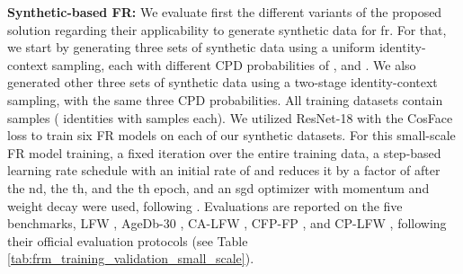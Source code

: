\documentclass[10pt,twocolumn,letterpaper]{article}
\begin{document}
\textbf{Synthetic-based FR:}
We evaluate first the different variants of the proposed solution regarding their applicability to generate synthetic data for \acrshort{fr}. For that, we start by generating three sets of synthetic data using a uniform identity-context sampling, each with different CPD probabilities of ,  and . We also generated other three sets of synthetic data using a two-stage identity-context sampling, with the same three CPD probabilities. All training datasets contain  samples ( identities with  samples each). We utilized ResNet-18 \cite{ResNet} with the CosFace \cite{CosFace} loss to train six FR models on each of our synthetic datasets.
For this small-scale FR model training, a fixed  iteration over the entire training data, a step-based learning rate schedule with an initial rate of  and reduces it by a factor of  after the nd, the th, and the th epoch, and an \acrshort{sgd} optimizer with  momentum and  weight decay were used, following \cite{FBoutros2022USynthFace}. Evaluations are reported on the five benchmarks, LFW \cite{LFWDatabase}, AgeDb-30 \cite{AgeDB30Database}, CA-LFW \cite{CALFWDatabase}, CFP-FP \cite{CFPFPDatabase}, and CP-LFW \cite{CPLFWDatabase}, following their official evaluation protocols (see Table \ref{tab:frm_training_validation_small_scale}).
\end{document}
